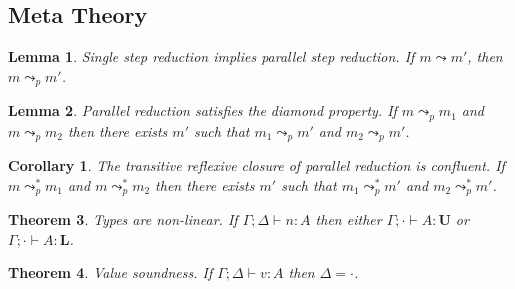 \documentclass{article}
\newtheorem{theorem}{Theorem}[section]
\newtheorem{corollary}{Corollary}[theorem]
\newtheorem{lemma}[theorem]{Lemma}
\newcommand{\U}{\textbf{U}}
\renewcommand{\L}{\textbf{L}}
\newcommand{\step}{\leadsto}
\newcommand{\pstep}{\leadsto_p}
\begin{document}
  \subsection{Meta Theory}
  \begin{lemma}
    Single step reduction implies parallel step reduction. If $m \step m'$, then $m \pstep m'$.
  \end{lemma}

  \begin{lemma}
    Parallel reduction satisfies the diamond property. If $m \pstep m_1$ and $m \pstep m_2$ then there exists $m'$ such that $m_1 \pstep m'$ and $m_2 \pstep m'$.
  \end{lemma}

  \begin{corollary}
    The transitive reflexive closure of parallel reduction is confluent. If $m \pstep^* m_1$ and $m \pstep^* m_2$ then there exists $m'$ such that $m_1 \pstep^* m'$ and $m_2 \pstep^* m'$.
  \end{corollary}

  \begin{theorem}
    Types are non-linear. If $\Gamma; \Delta \vdash n : A$ then either $\Gamma; \cdot \vdash A : \U$ or $\Gamma; \cdot \vdash A : \L$.
  \end{theorem}

  \begin{theorem}
    Value soundness. If $\Gamma; \Delta \vdash v : A$ then $\Delta = \cdot$.
  \end{theorem}
\end{document}
